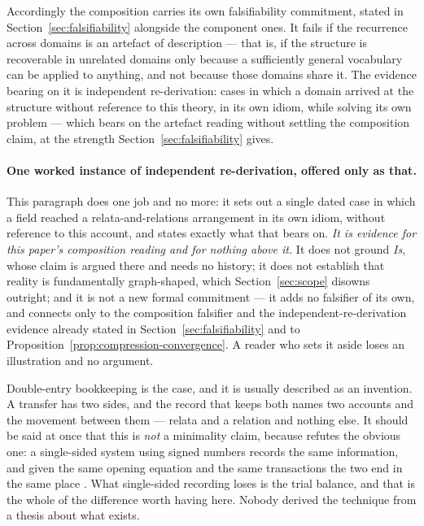 \documentclass[11pt,a4paper]{article}
\theoremstyle{remark}\newtheorem{remark}[definition]{Remark}
\begin{document}
Accordingly the composition carries its own falsifiability commitment, stated in Section~\ref{sec:falsifiability} alongside the component ones. It fails if the recurrence across domains is an artefact of description --- that is, if the structure is recoverable in unrelated domains only because a sufficiently general vocabulary can be applied to anything, and not because those domains share it. The evidence bearing on it is independent re-derivation: cases in which a domain arrived at the
structure without reference to this theory, in its own idiom, while solving its own problem --- which
bears on the artefact reading without settling the composition claim, at the strength
Section~\ref{sec:falsifiability} gives.

\paragraph{One worked instance of independent re-derivation, offered only as that.}
This paragraph does one job and no more: it sets out a single dated case in which a field reached a
relata-and-relations arrangement in its own idiom, without reference to this account, and states
exactly what that bears on. \emph{It is evidence for this paper's composition reading and for nothing
above it.} It does not ground \emph{Is}, whose claim is argued there and needs no history; it does not
establish that reality is fundamentally graph-shaped, which Section~\ref{sec:scope} disowns
outright; and it is not a new formal commitment --- it adds no falsifier of its own, and connects only
to the composition falsifier and the independent-re-derivation evidence already stated in
Section~\ref{sec:falsifiability} and to Proposition~\ref{prop:compression-convergence}. A reader who
sets it aside loses an illustration and no argument.

Double-entry bookkeeping is the case, and it is usually described as an invention. A transfer has two
sides, and the record that keeps both names two accounts and the movement between them --- relata and a
relation and nothing else. It should be said at once that this is \emph{not} a minimality claim, because
\citeauthor{ellerman2014} refutes the obvious one: a single-sided system using signed numbers records
the same information, and given the same opening equation and the same transactions the two end in the
same place \citep{ellerman2014}. What single-sided recording loses is the trial balance, and that is
the whole of the difference worth having here. Nobody derived the technique from a thesis about what
exists.
\end{document}
